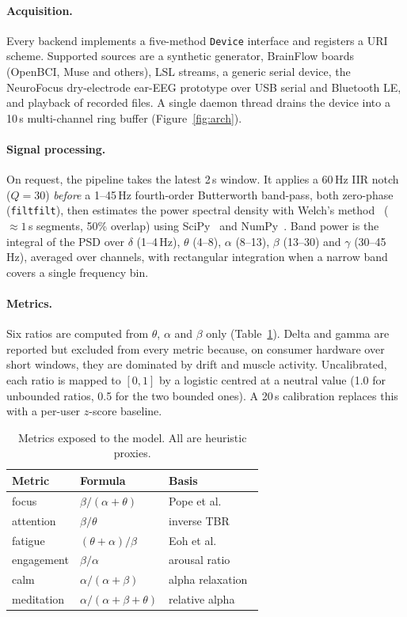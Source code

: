 \documentclass[10pt,twocolumn,letterpaper]{article}
\begin{document}
\paragraph{Acquisition.} Every backend implements a five-method
\texttt{Device} interface and registers a URI scheme. Supported sources are a
synthetic generator, BrainFlow boards (OpenBCI, Muse and others), LSL streams,
a generic serial device, the NeuroFocus dry-electrode ear-EEG prototype over USB
serial and Bluetooth LE, and playback of recorded files. A single daemon thread
drains the device into a 10\,s multi-channel ring buffer (Figure~\ref{fig:arch}).

\paragraph{Signal processing.} On request, the pipeline takes the latest 2\,s
window. It applies a 60\,Hz IIR notch ($Q=30$) \emph{before} a 1--45\,Hz
fourth-order Butterworth band-pass, both zero-phase (\texttt{filtfilt}), then
estimates the power spectral density with Welch's method~\citep{welch1967}
(${\approx}1$\,s segments, 50\% overlap) using SciPy~\citep{virtanen2020} and
NumPy~\citep{harris2020}. Band power is the integral of the PSD over
$\delta$ (1--4\,Hz), $\theta$ (4--8), $\alpha$ (8--13), $\beta$ (13--30) and
$\gamma$ (30--45\,Hz), averaged over channels, with rectangular integration when
a narrow band covers a single frequency bin.

\paragraph{Metrics.} Six ratios are computed from $\theta$, $\alpha$ and
$\beta$ only (Table~\ref{tab:metrics}). Delta and gamma are reported but excluded
from every metric because, on consumer hardware over short windows, they are
dominated by drift and muscle activity. Uncalibrated, each ratio is mapped to
$[0,1]$ by a logistic centred at a neutral value (1.0 for unbounded ratios, 0.5
for the two bounded ones). A 20\,s calibration replaces this with a per-user
$z$-score baseline.

\begin{table}[t]
\centering\small
\caption{Metrics exposed to the model. All are heuristic proxies.}
\label{tab:metrics}
\begin{tabular}{@{}lll@{}}
\toprule
Metric & Formula & Basis \\
\midrule
focus      & $\beta/(\alpha+\theta)$        & Pope et al.~\citep{pope1995} \\
attention  & $\beta/\theta$                 & inverse TBR~\citep{monastra1999,arns2013} \\
fatigue    & $(\theta+\alpha)/\beta$        & Eoh et al.~\citep{eoh2005} \\
engagement & $\beta/\alpha$                 & arousal ratio \\
calm       & $\alpha/(\alpha+\beta)$        & alpha relaxation~\citep{barry2007} \\
meditation & $\alpha/(\alpha+\beta+\theta)$ & relative alpha~\citep{berger1929} \\
\bottomrule
\end{tabular}
\end{table}
\end{document}
